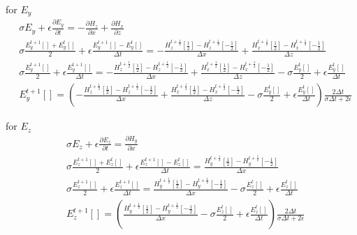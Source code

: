 for $E_{y}$
\begin{equation}
\begin{split}
&\sigma  E_{y} + \epsilon \frac{\partial  E_{y}}{\partial t} = -\frac{\partial  H_{z}}{\partial x}+\frac{\partial  H_{x}}{\partial z}\\
&\sigma  \frac{E_{y}^{t+1}[]+E_{y}^{t}[]}{2} + \epsilon \frac{E_{y}^{t+1}[]-E_{y}^{t}[]}{\Delta t} = -\frac{H_{z}^{t+\frac{1}{2}}[\frac{1}{2}]-H_{z}^{t+\frac{1}{2}}[-\frac{1}{2}]}{\Delta x}+\frac{H_{x}^{t+\frac{1}{2}}[\frac{1}{2}]-H_{x}^{t+\frac{1}{2}}[-\frac{1}{2}]}{\Delta z}\\
&\sigma  \frac{E_{y}^{t+1}[]}{2} + \epsilon \frac{E_{y}^{t+1}[]}{\Delta t} = -\frac{H_{z}^{t+\frac{1}{2}}[\frac{1}{2}]-H_{z}^{t+\frac{1}{2}}[-\frac{1}{2}]}{\Delta x}+\frac{H_{x}^{t+\frac{1}{2}}[\frac{1}{2}]-H_{x}^{t+\frac{1}{2}}[-\frac{1}{2}]}{\Delta z}-\sigma \frac{E_{y}^{t}[]}{2} + \epsilon \frac{E_{y}^{t}[]}{\Delta t}\\
&E_{y}^{t+1}[] = \left ( -\frac{H_{z}^{t+\frac{1}{2}}[\frac{1}{2}]-H_{z}^{t+\frac{1}{2}}[-\frac{1}{2}]}{\Delta x}+\frac{H_{x}^{t+\frac{1}{2}}[\frac{1}{2}]-H_{x}^{t+\frac{1}{2}}[-\frac{1}{2}]}{\Delta z}-\sigma \frac{E_{y}^{t}[]}{2} + \epsilon \frac{E_{y}^{t}[]}{\Delta t} \right ) \frac{2 \Delta t}{\sigma \Delta t  + 2 \epsilon}
\end{split}
\end{equation}

for $E_{z}$
\begin{equation}
\begin{split}
&\sigma  E_{z} + \epsilon \frac{\partial  E_{z}}{\partial t} = \frac{\partial  H_{y}}{\partial x}\\
&\sigma  \frac{E_{z}^{t+1}[]+E_{z}^{t}[]}{2} + \epsilon \frac{E_{z}^{t+1}[]-E_{z}^{t}[]}{\Delta t} = \frac{H_{y}^{t+\frac{1}{2}}[\frac{1}{2}]-H_{y}^{t+\frac{1}{2}}[-\frac{1}{2}]}{\Delta x}\\
&\sigma  \frac{E_{z}^{t+1}[]}{2} + \epsilon \frac{E_{z}^{t+1}[]}{\Delta t} = \frac{H_{y}^{t+\frac{1}{2}}[\frac{1}{2}]-H_{y}^{t+\frac{1}{2}}[-\frac{1}{2}]}{\Delta x}-\sigma  \frac{E_{z}^{t}[]}{2} + \epsilon \frac{E_{z}^{t}[]}{\Delta t}\\
&E_{z}^{t+1}[]= \left ( \frac{H_{y}^{t+\frac{1}{2}}[\frac{1}{2}]-H_{y}^{t+\frac{1}{2}}[-\frac{1}{2}]}{\Delta x}-\sigma  \frac{E_{z}^{t}[]}{2} + \epsilon \frac{E_{z}^{t}[]}{\Delta t} \right ) \frac{2 \Delta t}{\sigma \Delta t  + 2 \epsilon}\\
\end{split}
\end{equation}


